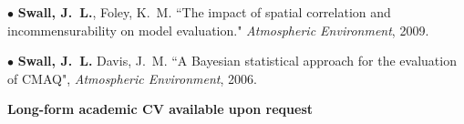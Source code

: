 \documentclass[11pt]{article}
\begin{document}

$\bullet$ \textbf{Swall, J.~L.}, Foley, K.~M.  ``The impact of spatial
correlation and incommensurability on model evaluation."
\textit{Atmospheric Environment}, 2009.

$\bullet$ \textbf{Swall, J.~L.} Davis, J.~M. ``A Bayesian
statistical approach for the evaluation of CMAQ", \textit{Atmospheric
Environment}, 2006.




\vspace*{0.3in}
\textbf{Long-form academic CV available upon request}
\end{document}
